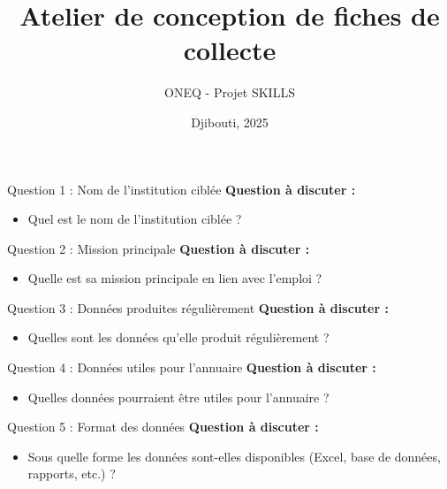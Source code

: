 \documentclass{beamer}
\title{Atelier de conception de fiches de collecte}
\author{ONEQ - Projet SKILLS}
\date{Djibouti, 2025}
\begin{document}
\frame{\titlepage}

\begin{frame}{Question 1 : Nom de l’institution ciblée}
\pause
\textbf{Question à discuter :}
\begin{itemize}
  \item Quel est le nom de l’institution ciblée ?
\end{itemize}
\end{frame}

\begin{frame}{Question 2 : Mission principale}
\pause
\textbf{Question à discuter :}
\begin{itemize}
  \item Quelle est sa mission principale en lien avec l’emploi ?
\end{itemize}
\end{frame}

\begin{frame}{Question 3 : Données produites régulièrement}
\pause
\textbf{Question à discuter :}
\begin{itemize}
  \item Quelles sont les données qu’elle produit régulièrement ?
\end{itemize}
\end{frame}

\begin{frame}{Question 4 : Données utiles pour l’annuaire}
\pause
\textbf{Question à discuter :}
\begin{itemize}
  \item Quelles données pourraient être utiles pour l’annuaire ?
\end{itemize}
\end{frame}

\begin{frame}{Question 5 : Format des données}
\pause
\textbf{Question à discuter :}
\begin{itemize}
  \item Sous quelle forme les données sont-elles disponibles (Excel, base de données, rapports, etc.) ?
\end{itemize}
\end{frame}
\end{document}
